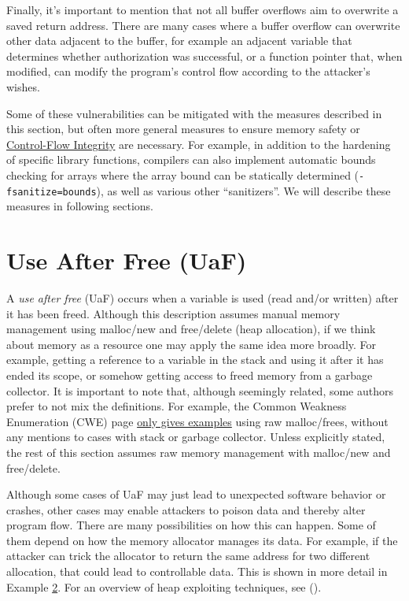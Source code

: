 \documentclass[
  a4paper,
]{report}
\begin{document}
Finally, it's important to mention that not all buffer overflows aim to
overwrite a saved return address. There are many cases where a buffer
overflow can overwrite other data adjacent to the buffer, for example an
adjacent variable that determines whether authorization was successful,
or a function pointer that, when modified, can modify the program's
control flow according to the attacker's wishes.

Some of these vulnerabilities can be mitigated with the measures
described in this section, but often more general measures to ensure
memory safety or \hyperref[control-flow-integrity-cfi]{Control-Flow
Integrity} are necessary. For example, in addition to the hardening of
specific library functions, compilers can also implement automatic
bounds checking for arrays where the array bound can be statically
determined (\texttt{-fsanitize=bounds}), as well as various other
``sanitizers''. We will describe these measures in following sections.

\section{Use After Free (UaF)}\label{use-after-free-uaf}

A \emph{\label{__index_entry_14}{use after
free}} (UaF) occurs when a variable is used
(read and/or written) after it has been freed. Although this description
assumes manual memory management using malloc/new and free/delete (heap
allocation), if we think about memory as a resource one may apply the
same idea more broadly. For example, getting a reference to a variable
in the stack and using it after it has ended its scope, or somehow
getting access to freed memory from a garbage collector. It is important
to note that, although seemingly related, some authors prefer to not mix
the definitions. For example, the
\label{__index_entry_15}{Common Weakness
Enumeration} (CWE) page
\href{https://cwe.mitre.org/data/definitions/416.html}{only gives
examples} using raw malloc/frees, without any mentions to cases with
stack or garbage collector. Unless explicitly stated, the rest of this
section assumes raw memory management with malloc/new and free/delete.

Although some cases of UaF may just lead to unexpected software behavior
or crashes, other cases may enable attackers to poison data and thereby
alter program flow. There are many possibilities on how this can happen.
Some of them depend on how the memory allocator manages its data. For
example, if the attacker can trick the allocator to return the same
address for two different allocation, that could lead to controllable
data. This is shown in more detail in Example
\hyperref[ex:use-after-free]{2}. For an overview of heap exploiting
techniques, see ().
\end{document}
